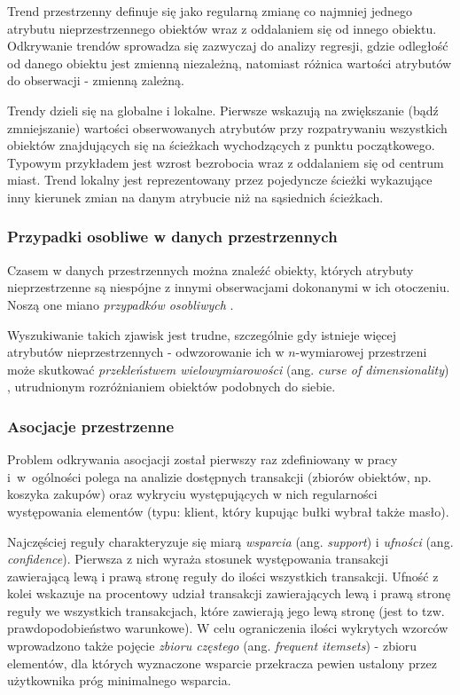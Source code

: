 \documentclass[12pt]{article}
\begin{document}
Trend przestrzenny definuje się \cite{toptrendy} jako regularną zmianę co najmniej jednego atrybutu nieprzestrzennego obiektów wraz z oddalaniem się od innego obiektu. Odkrywanie trendów sprowadza się zazwyczaj do analizy regresji, gdzie odległość od danego obiektu jest zmienną niezależną, natomiast różnica wartości atrybutów do obserwacji - zmienną zależną.

Trendy dzieli się na globalne i lokalne. Pierwsze wskazują na zwiększanie (bądź zmniejszanie) wartości obserwowanych atrybutów przy rozpatrywaniu wszystkich obiektów znajdujących się na ścieżkach wychodzących z punktu początkowego. Typowym przykładem jest wzrost bezrobocia wraz z oddalaniem się od centrum miast. Trend lokalny jest reprezentowany przez pojedyncze ścieżki wykazujące inny kierunek zmian na danym atrybucie niż na sąsiednich ścieżkach.

\subsubsection{Przypadki osobliwe w danych przestrzennych}

Czasem w danych przestrzennych można znaleźć obiekty, których atrybuty nieprzestrzenne są niespójne z innymi obserwacjami dokonanymi w ich otoczeniu. Noszą one miano \textit{przypadków osobliwych} \cite{przypadeg}. 

Wyszukiwanie takich zjawisk jest trudne, szczególnie gdy istnieje więcej atrybutów nieprzestrzennych - odwzorowanie ich w $n$-wymiarowej przestrzeni może skutkować \textit{przekleństwem wielowymiarowości} (ang. \textit{curse of dimensionality}) \cite{kurwa}, utrudnionym rozróżnianiem obiektów podobnych do siebie.

\subsubsection{Asocjacje przestrzenne}

Problem odkrywania asocjacji został pierwszy raz zdefiniowany w pracy \cite{asoc} i~w~ogólności polega na analizie dostępnych transakcji (zbiorów obiektów, np. koszyka zakupów) oraz wykryciu występujących w nich regularności występowania elementów (typu: klient, który kupując bułki wybrał także masło).

Najczęściej reguły charakteryzuje się miarą \textit{wsparcia} (ang. \textit{support}) i \textit{ufności} (ang. \textit{confidence}). Pierwsza z nich wyraża stosunek występowania transakcji zawierającą lewą i prawą stronę reguły do ilości wszystkich transakcji. Ufność z kolei wskazuje na procentowy udział transakcji zawierających lewą i prawą stronę reguły we wszystkich transakcjach, które zawierają jego lewą stronę (jest to tzw. prawdopodobieństwo warunkowe). W celu ograniczenia ilości wykrytych wzorców wprowadzono także pojęcie \textit{zbioru częstego} (ang. \textit{frequent itemsets}) - zbioru elementów, dla których wyznaczone wsparcie przekracza pewien ustalony przez użytkownika próg minimalnego wsparcia. 
\end{document}
